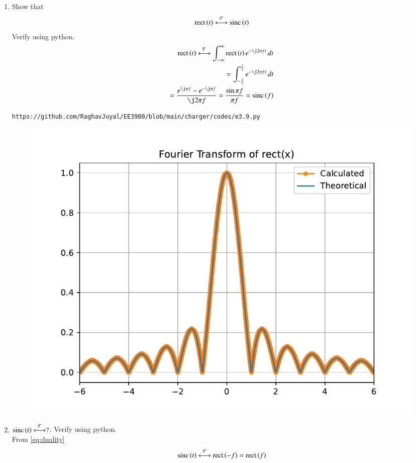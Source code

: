 \documentclass[journal,12pt,twocolumn]{IEEEtran}
\renewcommand\thesection{\arabic{section}}
\begin{document}
\begin{enumerate}[label=\thesection.\arabic*
,ref=\thesection.\theenumi]
\begin{figure}[!ht]
\begin{center}
	\end{center}
	\label{fig:}	
\end{figure}
\vspace{4cm}
 \item Show that 
 \begin{align}
	 \text{rect}\left(t\right) \overset{\mathcal{F}}{ \longleftrightarrow} \text{sinc}\left(t\right)
 \end{align}
 Verify using python.\\
\solution 
\begin{align}
	\rect{t}\system{F}\int_{-\infty}^{\infty}\rect{t}e^{-\j2\pi ft}\, dt \\
	=\int_{-\frac{1}{2}}^{\frac{1}{2}}e^{-\j2\pi ft}\, dt \\
	=\frac{e^{\j\pi f} - e^{-\j\pi f}}{\j2\pi f} = \frac{\sin{\pi f}}{\pi f} = \sinc{f}
	\label{eq:fourier-rect}
\end{align}		
\begin{lstlisting}
https://github.com/RaghavJuyal/EE3900/blob/main/charger/codes/e3.9.py
\end{lstlisting}
\begin{figure}[!ht]
	\begin{center}
		\includegraphics[width=\columnwidth]{./figs/e3.9.pdf}
	\end{center}
	\label{fig:}	
\end{figure}
 \item 
$	 \text{sinc}\left(t\right)\overset{\mathcal{F}}{ \longleftrightarrow} ?$.  Verify using python.\\
\solution From \eqref{eq:duality}
\begin{align}
	\sinc{t}\system{F}\rect{-f}=\rect{f}
	\label{eq:fourier-sinc}

\end{align}
\end{enumerate}
\end{document}
